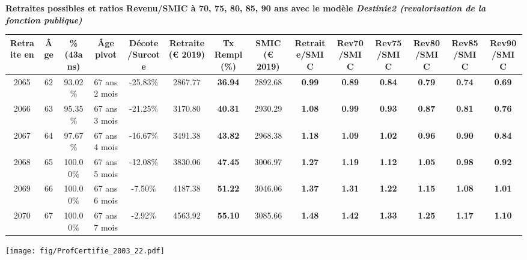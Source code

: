  \vspace{0.1cm} 
{\bf \noindent Retraites possibles et ratios Revenu/SMIC à 70, 75, 80, 85, 90 ans avec le modèle \emph{Destinie2 (revalorisation de la fonction publique)}}  
 
\begin{adjustbox}{max width=\textwidth} 
\begin{tabular}[htb]{|c|c||c|c|c||c|c||c||c|c|c|c|c|c|} 
\hline 
 Retraite en &  Âge &  \%(43ans) &  Âge pivot &  Décote/Surcote &  Retraite (\euro{} 2019) &  Tx Rempl(\%) &  SMIC (\euro{} 2019) &  Retraite/SMIC &  Rev70/SMIC &  Rev75/SMIC &  Rev80/SMIC &  Rev85/SMIC &  Rev90/SMIC \\ 
\hline \hline 
 2065 &  62 &  93.02\% &  67 ans 2 mois &  -25.83\% &  2867.77 &  {\bf 36.94} &  2892.68 &  {\bf {\color{red} 0.99}} &  {\bf {\color{red} 0.89}} &  {\bf {\color{red} 0.84}} &  {\bf {\color{red} 0.79}} &  {\bf {\color{red} 0.74}} &  {\bf {\color{red} 0.69}} \\ 
\hline 
 2066 &  63 &  95.35\% &  67 ans 3 mois &  -21.25\% &  3170.80 &  {\bf 40.31} &  2930.29 &  {\bf 1.08} &  {\bf {\color{red} 0.99}} &  {\bf {\color{red} 0.93}} &  {\bf {\color{red} 0.87}} &  {\bf {\color{red} 0.81}} &  {\bf {\color{red} 0.76}} \\ 
\hline 
 2067 &  64 &  97.67\% &  67 ans 4 mois &  -16.67\% &  3491.38 &  {\bf 43.82} &  2968.38 &  {\bf 1.18} &  {\bf 1.09} &  {\bf 1.02} &  {\bf {\color{red} 0.96}} &  {\bf {\color{red} 0.90}} &  {\bf {\color{red} 0.84}} \\ 
\hline 
 2068 &  65 &  100.00\% &  67 ans 5 mois &  -12.08\% &  3830.06 &  {\bf 47.45} &  3006.97 &  {\bf 1.27} &  {\bf 1.19} &  {\bf 1.12} &  {\bf 1.05} &  {\bf {\color{red} 0.98}} &  {\bf {\color{red} 0.92}} \\ 
\hline 
 2069 &  66 &  100.00\% &  67 ans 6 mois &  -7.50\% &  4187.38 &  {\bf 51.22} &  3046.06 &  {\bf 1.37} &  {\bf 1.31} &  {\bf 1.22} &  {\bf 1.15} &  {\bf 1.08} &  {\bf 1.01} \\ 
\hline 
 2070 &  67 &  100.00\% &  67 ans 7 mois &  -2.92\% &  4563.92 &  {\bf 55.10} &  3085.66 &  {\bf 1.48} &  {\bf 1.42} &  {\bf 1.33} &  {\bf 1.25} &  {\bf 1.17} &  {\bf 1.10} \\ 
\hline 
\hline 
\end{tabular} 
\end{adjustbox} 
 
 \vspace{0.1cm} 

 \begin{center}\texttt{[image: fig/ProfCertifie\_2003\_22.pdf]}\end{center} \label{fig/ProfCertifie_2003_22.pdf} 

